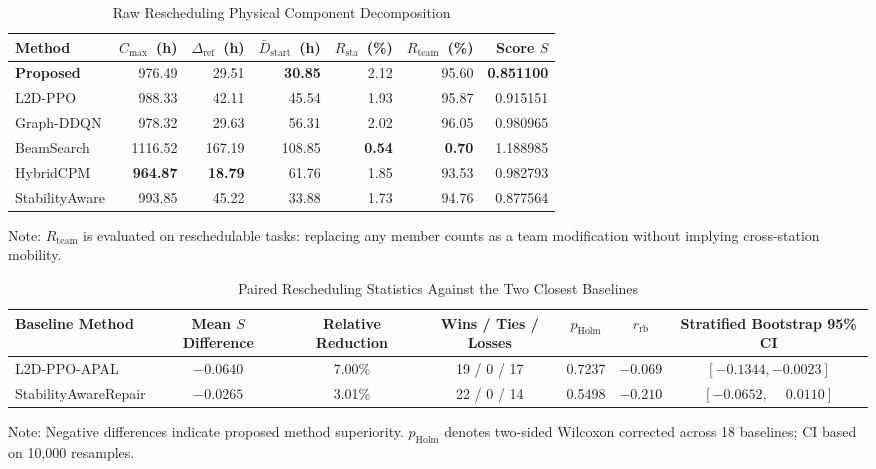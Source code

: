 \documentclass[journal,10pt]{IEEEtran}
\renewcommand{\arraystretch}{1.06}
\begin{document}
\begin{table}[!t]
\centering
\caption{Raw Rescheduling Physical Component Decomposition}
\label{tab:raw_components}
\setlength{\tabcolsep}{3pt}
\renewcommand{\arraystretch}{1.05}
\begin{adjustbox}{max width=\columnwidth}
\begin{tabular}{@{}lrrrrrr@{}}
\toprule
\textbf{Method} & $C_{\max}$~(h) & $\Delta_{\mathrm{ref}}$~(h) & $\bar D_{\mathrm{start}}$~(h) & $R_{\mathrm{sta}}$~(\%) & $R_{\mathrm{team}}$~(\%) & \textbf{Score} $S$ \\
\midrule
\textbf{Proposed} & 976.49 & 29.51 & \textbf{30.85} & 2.12 & 95.60 & \textbf{0.851100} \\
L2D-PPO & 988.33 & 42.11 & 45.54 & 1.93 & 95.87 & 0.915151 \\
Graph-DDQN & 978.32 & 29.63 & 56.31 & 2.02 & 96.05 & 0.980965 \\
BeamSearch & 1116.52 & 167.19 & 108.85 & \textbf{0.54} & \textbf{0.70} & 1.188985 \\
HybridCPM & \textbf{964.87} & \textbf{18.79} & 61.76 & 1.85 & 93.53 & 0.982793 \\
StabilityAware & 993.85 & 45.22 & 33.88 & 1.73 & 94.76 & 0.877564 \\
\bottomrule
\end{tabular}
\end{adjustbox}
\par\smallskip
{\footnotesize Note: $R_{\mathrm{team}}$ is evaluated on reschedulable tasks: replacing any member counts as a team modification without implying cross-station mobility.}
\end{table}

\begin{table}[!t]
\centering
\caption{Paired Rescheduling Statistics Against the Two Closest Baselines}
\label{tab:paired_stats}
\setlength{\tabcolsep}{8pt}
\renewcommand{\arraystretch}{1.06}
\begin{adjustbox}{max width=\textwidth}
\begin{tabular}{@{}lcccccc@{}}
\toprule
\textbf{Baseline Method} & \textbf{Mean $S$ Difference} & \textbf{Relative Reduction} & \textbf{Wins / Ties / Losses} & $p_{\mathrm{Holm}}$ & $r_{\mathrm{rb}}$ & \textbf{Stratified Bootstrap 95\% CI} \\
\midrule
L2D-PPO-APAL & $-0.0640$ & 7.00\% & 19 / 0 / 17 & 0.7237 & $-0.069$ & $[-0.1344, -0.0023]$ \\
StabilityAwareRepair & $-0.0265$ & 3.01\% & 22 / 0 / 14 & 0.5498 & $-0.210$ & $[-0.0652, \phantom{-}0.0110]$ \\
\bottomrule
\end{tabular}
\end{adjustbox}
\par\smallskip
{\footnotesize Note: Negative differences indicate proposed method superiority. $p_{\mathrm{Holm}}$ denotes two-sided Wilcoxon corrected across 18 baselines; CI based on 10,000 resamples.}
\end{table}
\newpage
\end{document}
